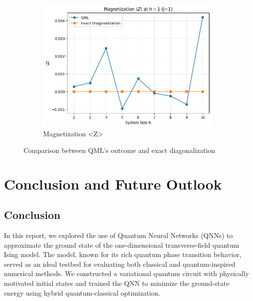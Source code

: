 \documentclass[a4paper]{article}
\begin{document}
\begin{figure}[htbp]
\begin{subfigure}[b]{0.32\textwidth}
        \label{(b)}
    \end{subfigure}
    \hfill %
    \begin{subfigure}[b]{0.32\textwidth}
        \centering
        \includegraphics[width=\linewidth]{images/cmp_Z.png} %
        \caption{Magnetization <Z>}
        \label{(c)}
    \end{subfigure}
    
    \caption{Comparison between QML's outcome and exact diagonalization}
    \label{fig:three_images_together}
\end{figure}

\section{Conclusion and Future Outlook}
\subsection{Conclusion}
In this report, we explored the use of Quantum Neural Networks (QNNs) to approximate the ground state of the one-dimensional transverse-field quantum Ising model. The model, known for its rich quantum phase transition behavior, served as an ideal testbed for evaluating both classical and quantum-inspired numerical methods. We constructed a variational quantum circuit with physically motivated initial states and trained the QNN to minimize the ground-state energy using hybrid quantum-classical optimization.
\end{document}
